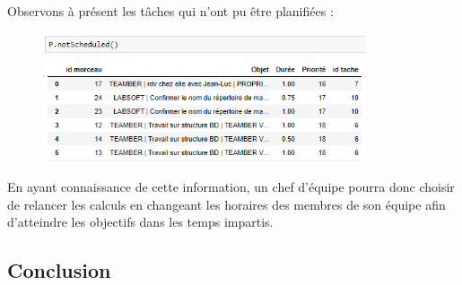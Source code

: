 \documentclass[12pt]{article}
\begin{document}
Observons à présent les tâches qui n'ont pu être planifiées :

\begin{figure}[H]
\begin{center}
\includegraphics[width=0.85\textwidth]{oedt3}
\end{center}
\end{figure}

En ayant connaissance de cette information, un chef d'équipe pourra donc choisir de relancer les calculs en changeant les horaires des membres de son équipe afin d'atteindre les objectifs dans les temps impartis.

\subsection{Conclusion}
\end{document}
